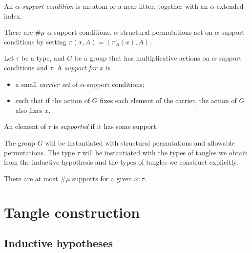 \documentclass{article}
\begin{document}
\begin{definition}
    An \emph{\( \alpha \)-support condition} is an atom or a near litter, together with an \( \alpha \)-extended index.
\end{definition}
\begin{lemma}
    There are \( \#\mu \) \( \alpha \)-support conditions.
    \( \alpha \)-structural permutations act on \( \alpha \)-support conditions by setting \( \pi(x, A) = (\pi_A(x), A) \).
\end{lemma}
\begin{definition}
    Let \( \tau \) be a type, and \( G \) be a group that has multiplicative actions on \( \alpha \)-support conditions and \( \tau \).
    A \emph{support for \( x \)} is
    \begin{itemize}
        \item a small \emph{carrier set} of \( \alpha \)-support conditions;
        \item such that if the action of \( G \) fixes each element of the carrier, the action of \( G \) also fixes \( x \).
    \end{itemize}
    An element of \( \tau \) is \emph{supported} if it has some support.
\end{definition}
\begin{remark}
    The group \( G \) will be instantiated with structural permutations and allowable permutations.
    The type \( \tau \) will be instantiated with the types of tangles we obtain from the inductive hypothesis and the types of tangles we construct explicitly.
\end{remark}
\begin{lemma}
    There are at most \( \#\mu \) supports for a given \( x : \tau \).
\end{lemma}

\section{Tangle construction}

\subsection{Inductive hypotheses}
\end{document}
